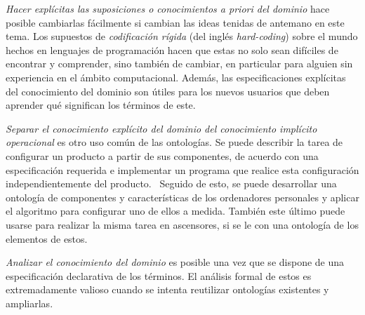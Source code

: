 \textit{Hacer explícitas las suposiciones o conocimientos a priori del dominio} hace posible cambiarlas fácilmente si cambian las ideas tenidas de antemano en este tema. Los supuestos de \textit{codificación rígida} (del inglés \textit{hard-coding}) sobre el mundo hechos en lenguajes de programación hacen que estas no solo sean difíciles de encontrar y comprender, sino también de cambiar, en particular para alguien sin experiencia en el ámbito computacional. Además, las especificaciones explícitas del conocimiento del dominio son útiles para los nuevos usuarios que deben aprender qué significan los términos de este.

\textit{Separar el conocimiento explícito del dominio del conocimiento implícito operacional} es otro uso común de las ontologías. Se puede describir la tarea de configurar un producto a partir de sus componentes, de acuerdo con una especificación requerida e implementar un programa que realice esta configuración independientemente del producto.~\cite{ref:11} Seguido de esto, se puede desarrollar una ontología de componentes y características de los ordenadores personales y aplicar el algoritmo para configurar uno de ellos a medida. También este último puede usarse para realizar la misma tarea en ascensores, si se le  con una ontología de los elementos de estos.~\cite{ref:12}

\textit{Analizar el conocimiento del dominio} es posible una vez que se dispone de una especificación declarativa de los términos. El análisis formal de estos es extremadamente valioso cuando se intenta reutilizar ontologías existentes y ampliarlas.~\cite{ref:13}